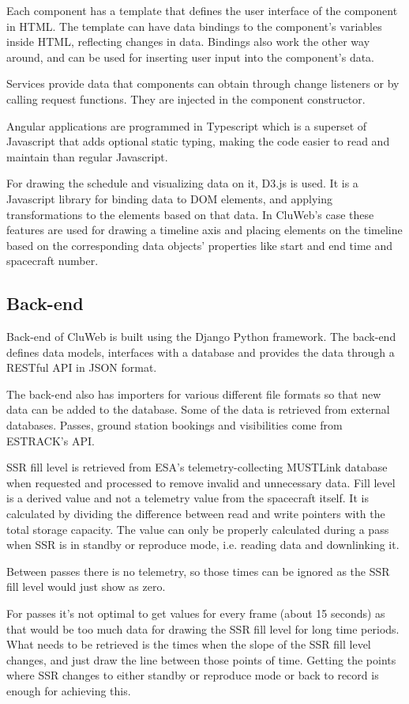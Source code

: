 Each component has a template that defines the user interface of the component in HTML. The template can have data bindings to the component's variables inside HTML, reflecting changes in data. Bindings also work the other way around, and can be used for inserting user input into the component's data.

Services provide data that components can obtain through change listeners or by calling request functions. They are injected in the component constructor.

Angular applications are programmed in Typescript which is a superset of Javascript that adds optional static typing, making the code easier to read and maintain than regular Javascript.

For drawing the schedule and visualizing data on it, D3.js is used. It is a Javascript library for binding data to DOM elements, and applying transformations to the elements based on that data. In CluWeb's case these features are used for drawing a timeline axis and placing elements on the timeline based on the corresponding data objects' properties like start and end time and spacecraft number.

\subsection{Back-end}
Back-end of CluWeb is built using the Django Python framework. The back-end defines data models, interfaces with a database and provides the data through a RESTful API in JSON format.

The back-end also has importers for various different file formats so that new data can be added to the database. Some of the data is retrieved from external databases. Passes, ground station bookings and visibilities come from ESTRACK's API.

SSR fill level is retrieved from ESA's telemetry-collecting MUSTLink database when requested and processed to remove invalid and unnecessary data. Fill level is a derived value and not a telemetry value from the spacecraft itself. It is calculated by dividing the difference between read and write pointers with the total storage capacity. The value can only be properly calculated during a pass when SSR is in standby or reproduce mode, i.e. reading data and downlinking it. 

Between passes there is no telemetry, so those times can be ignored as the SSR fill level would just show as zero.

For passes it's not optimal to get values for every frame (about 15 seconds) as that would be too much data for drawing the SSR fill level for long time periods. What needs to be retrieved is the times when the slope of the SSR fill level changes, and just draw the line between those points of time. Getting the points where SSR changes to either standby or reproduce mode or back to record is enough for achieving this.

